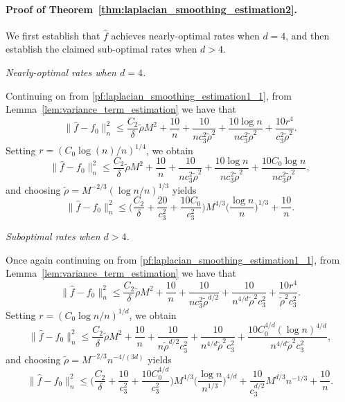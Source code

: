 \documentclass[twoside]{article}
\newcommand{\1}{\mathbf{1}}
\newcommand{\wt}[1]{\widetilde{#1}}
\newcommand{\wh}[1]{\widehat{#1}}
\theoremstyle{definition}
\theoremstyle{remark}
\begin{document}
\paragraph{Proof of Theorem~\ref{thm:laplacian_smoothing_estimation2}.}
We first establish that $\wh{f}$ achieves nearly-optimal rates when $d = 4$, and then establish the claimed sub-optimal rates when $d > 4$.

\textit{Nearly-optimal rates when $d = 4$.}

Continuing on from \eqref{pf:laplacian_smoothing_estimation1_1}, from Lemma~\ref{lem:variance_term_estimation} we have that
\begin{equation*}
\|\wh{f} - f_0\|_n^2 \leq \frac{C_2}{\delta} \wt{\rho} M^2 + \frac{10}{n} +  \frac{10}{nc_3^2\wt{\rho}^2} +  \frac{10 \log n}{nc_3^2\wt{\rho}^2} + \frac{10r^4}{c_3^2\wt{\rho}^2}.
\end{equation*}
Setting $r = (C_0\log(n)/n)^{1/4}$, we obtain
\begin{equation*}
\|\wh{f} - f_0\|_n^2 \leq \frac{C_2}{\delta} \wt{\rho} M^2 + \frac{10}{n} +  \frac{10}{nc_3^2\wt{\rho}^2} +  \frac{10 \log n}{nc_3^2\wt{\rho}^2} + \frac{10C_0\log n}{nc_3^2\wt{\rho}^2},
\end{equation*}
and choosing $\wt{\rho} = M^{-2/3}(\log n/n)^{1/3}$ yields
\begin{equation*}
\|\wh{f} - f_0\|_n^2 \leq \biggl(\frac{C_2}{\delta} + \frac{20}{c_3^2} + \frac{10C_0}{c_3^2}\biggr) M^{4/3} \biggl(\frac{\log n}{n}\biggr)^{1/3} + \frac{10}{n}.
\end{equation*}

\textit{Suboptimal rates when $d > 4$.}

Once again continuing on from \eqref{pf:laplacian_smoothing_estimation1_1}, from Lemma~\ref{lem:variance_term_estimation} we have that
\begin{equation*}
\|\wh{f} - f_0\|_n^2 \leq \frac{C_2}{\delta} \wt{\rho} M^2 + \frac{10}{n} + \frac{10}{nc_3^{2}\wt{\rho}^{d/2}} +  \frac{10}{n^{4/d}\wt{\rho}^2c_3^2} + \frac{10r^4}{\wt{\rho}^2c_3^2}.
\end{equation*}
Setting $r = (C_0\log n/n)^{1/d}$, we obtain
\begin{equation*}
\|\wh{f} - f_0\|_n^2 \leq \frac{C_2}{\delta} \wt{\rho} M^2 + \frac{10}{n} + \frac{10}{n\wt{\rho}^{d/2}c_3^{2}} +  \frac{10}{n^{4/d}\wt{\rho}^2c_3^2} + \frac{10C_0^{4/d}(\log n)^{4/d}}{n^{4/d}\wt{\rho}^2c_3^2},
\end{equation*}
and choosing $\wt{\rho} = M^{-2/3}n^{-4/(3d)}$ yields
\begin{equation*}
\|\wh{f} - f_0\|_n^2 \leq \biggl(\frac{C_2}{\delta} + \frac{10}{c_3^2} + \frac{10C_0^{4/d}}{c_3^2}\biggr)M^{4/3}\biggl(\frac{\log n}{n^{1/3}}\biggr)^{4/d} + \frac{10}{c_3^{d/2}}M^{d/3}n^{-1/3} + \frac{10}{n}.
\end{equation*}
\end{document}
